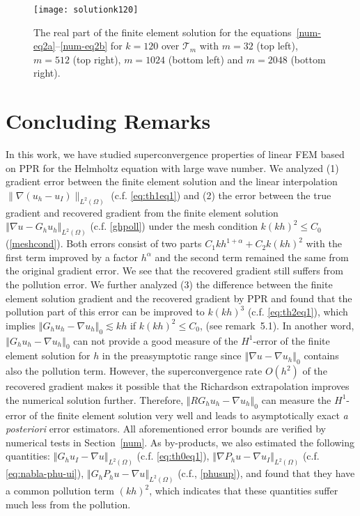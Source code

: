 \documentclass[leqno,final]{siamltex}
\numberwithin{equation}{section}
\newcommand{\norm}[1]{\left\Vert#1\right\Vert}
\newcommand{\ls}{\lesssim}
\newcommand{\na}{\nabla}
\newcommand{\Om}{\Omega}
\newcommand{\T}{\mathcal{T}}
\begin{document}
\begin{figure}[htbp]
\begin{center}
\texttt{[image: solutionk120]}
\caption{The real part of the finite element solution for the equations~\eqref{num-eq2a}--\eqref{num-eq2b} for $k=120$ over $\T_m$ with $m=32$ (top left), $m=512$ (top right), $m=1024$ (bottom left) and $m=2048$ (bottom right).}
\label{num-fig7}
\end{center}
\end{figure}

\section{Concluding Remarks}
In this work, we have studied superconvergence properties of linear FEM based on PPR for the Helmholtz equation with large wave number.
We analyzed (1) gradient error between the finite element solution and the linear interpolation  $\|\nabla(u_h-u_I)\|_{L^2(\Om)}$ (c.f. \eqref{eq:th1eq1}) and
(2) the error between the true gradient and recovered gradient from the finite element solution  $\norm{\na u-G_hu_h}_{L^2(\Om)}$ (c.f. \eqref{ghpoll}) under the mesh condition $k(kh)^2 \le C_0$ (\ref{meshcond}). Both errors consist of two parts $C_1kh^{1+\alpha}+C_2k(kh)^2$ with
the first term improved by a factor $h^\alpha$ and the second term remained the same from the original gradient error.
We see that the recovered gradient still suffers from the pollution error.
We further analyzed (3) the difference between the finite element solution gradient
and the recovered gradient by PPR and found that the pollution part of this error can be improved to
$k(kh)^3$ (c.f. \eqref{eq:th2eq1}), which implies
{$\norm{G_hu_h-\na u_h}_0\ls kh$ if $k(kh)^2\le C_0$, (see remark~5.1). In another word,  $\norm{G_hu_h-\na u_h}_0$ can not provide a good measure of the $H^1$-error of the finite element solution for $h$ in the preasymptotic range since  $\norm{\na u-\na u_h}_0$ contains also the pollution term. However, the superconvergence rate $O(h^2)$ of the recovered gradient makes it possible that the Richardson extrapolation improves the numerical solution further. Therefore, $\norm{RG_hu_h-\na u_h}_0$ can measure the $H^1$-error of the finite element solution very well
and leads to asymptotically exact {\it a posteriori} error estimators. All aforementioned error bounds are
verified by numerical tests in Section~\ref{num}.
 As by-products, we also estimated the following quantities:
$\norm{G_hu_I-\na u}_{L^2(\Om)}$ (c.f. \eqref{eq:th0eq1}),  $\norm{\na P_hu-\na u_I}_{L^2(\Om)}$ (c.f. \eqref{eq:nabla-phu-ui}), $\norm{G_hP_hu-\na u}_{L^2(\Om)}$ (c.f., \eqref{phusup}),
and found that they have a common pollution term $(kh)^2$, which indicates that these quantities suffer much less from the pollution.}




\end{document}
